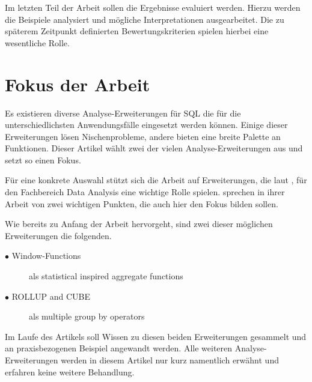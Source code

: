 Im letzten Teil der Arbeit sollen die Ergebnisse evaluiert werden. Hierzu werden
die Beispiele analysiert und mögliche Interpretationen ausgearbeitet. Die zu
späterem Zeitpunkt definierten Bewertungskriterien spielen hierbei eine
wesentliche Rolle.


\section{Fokus der Arbeit}
\label{sec:fokus_der_arbeit} Es existieren diverse Analyse-Erweiterungen für SQL
die für die unterschiedlichsten Anwendungsfälle eingesetzt werden können. Einige
dieser Erweiterungen lösen Nischenprobleme, andere bieten eine breite Palette an
Funktionen. Dieser Artikel wählt zwei der vielen Analyse-Erweiterungen aus und
setzt so einen Fokus.

Für eine konkrete Auswahl stützt sich die Arbeit auf Erweiterungen, die laut \citet[Kapitel3]{FOTACHE2015243},
für den Fachbereich Data Analysis eine wichtige Rolle spielen. \citet[Kapitel 3]{FOTACHE2015243}
sprechen in ihrer Arbeit von zwei wichtigen Punkten, die auch hier den Fokus
bilden sollen.

Wie bereits zu Anfang der Arbeit hervorgeht, sind zwei dieser möglichen Erweiterungen
die folgenden.

\begin{description}
	\item[$\bullet$ Window-Functions] als statistical inspired aggregate functions
		\\ \citep[Kapitel 4.3]{FOTACHE2015243}

	\item[$\bullet$ ROLLUP and CUBE] als multiple group by operators \\ \citep[Kapitel4.3]{FOTACHE2015243}
\end{description}

Im Laufe des Artikels soll Wissen zu diesen beiden Erweiterungen gesammelt und
an praxisbezogenen Beispiel angewandt werden. Alle weiteren Analyse-Erweiterungen
werden in diesem Artikel nur kurz namentlich erwähnt und erfahren keine weitere Behandlung.